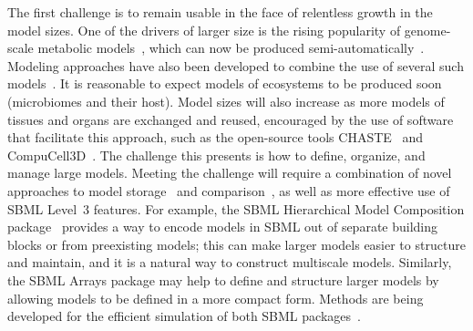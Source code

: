 \documentclass{sbml-paper}
\begin{document}
The first challenge is to remain usable in the face of relentless growth in the model sizes.  One of the drivers of larger size is the rising popularity of genome-scale metabolic models~\citep{Bordbar2014a}, which can now be produced semi-automatically~\citep{henry2010high, buchel2013path2models, Magnusdottir2017}.  Modeling approaches have also been developed to combine the use of several such models~\citep[e.g.,][]{bordbar2011multi}.  It is reasonable to expect models of ecosystems to be produced soon (\eg microbiomes and their host).  Model sizes will also increase as more models of tissues and organs are exchanged and reused, encouraged by the use of software that facilitate this approach, such as the open-source tools CHASTE~\citep{mirams2013chaste} and CompuCell3D~\citep{swat2012multi}.  The challenge this presents is how to define, organize, and manage large models.  Meeting the challenge will require a combination of novel approaches to model storage~\citep[e.g.,][]{Henkel2015combininga} and comparison~\citep[e.g.,][]{Scharm2016algorithm, Scharm2016comodi}, as well as more effective use of SBML Level~3 features.  For example, the SBML Hierarchical Model Composition package~\citep{Smith2015} provides a way to encode models in SBML out of separate building blocks or from preexisting models; this can make larger models easier to structure and maintain, and it is a natural way to construct multiscale models.  Similarly, the SBML Arrays package may help to define and structure larger models by allowing models to be defined in a more compact form.  Methods are being developed for the efficient simulation of both SBML packages~\citep{watanabe2014hierarchical, watanabe2016efficient}.
\end{document}
